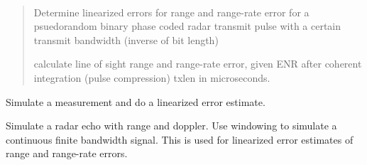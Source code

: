 \documentclass[letterpaper,10pt,english]{sphinxmanual}
\begin{document}

\begin{fulllineitems}
\label{\detokenize{modules/debris:debris.lin_error}}~\begin{quote}

Determine linearized errors for range and range-rate error
for a psuedorandom binary phase coded radar transmit pulse
with a certain transmit bandwidth (inverse of bit length)

calculate line of sight range and range-rate error,
given ENR after coherent integration (pulse compression)
txlen in microseconds.
\end{quote}

Simulate a measurement and do a linearized error estimate.

\end{fulllineitems}


\begin{fulllineitems}
\label{\detokenize{modules/debris:debris.precalculate_dr}}
\end{fulllineitems}


\begin{fulllineitems}
\label{\detokenize{modules/debris:debris.simulate_echo}}
Simulate a radar echo with range and doppler.
Use windowing to simulate a continuous finite bandwidth signal.
This is used for linearized error estimates of range and range-rate errors.

\end{fulllineitems}

\end{document}

